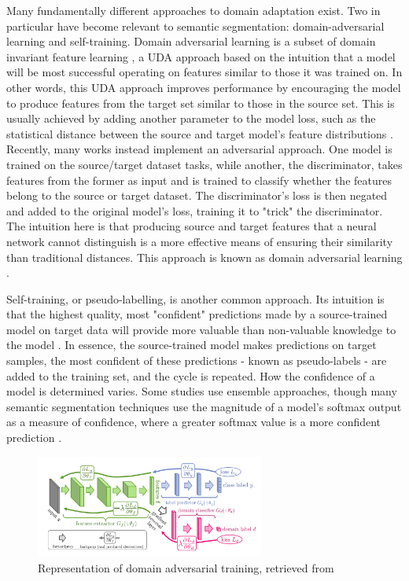 \documentclass[a4paper,12pt]{report}
\begin{document}
Many fundamentally different approaches to domain adaptation exist. Two in particular have become relevant to semantic segmentation: domain-adversarial learning and self-training. Domain adversarial learning is a subset of domain invariant feature learning \cite{wilson_survey_2020}, a UDA approach based on the intuition that a model will be most successful operating on features similar to those it was trained on. In other words, this UDA approach improves performance by encouraging the model to produce features from the target set similar to those in the source set. This is usually achieved by adding another parameter to the model loss, such as the statistical distance between the source and target model's feature distributions \cite{gretton_kernel_2006} \cite{sun_return_2015}. Recently, many works \cite{ganin_unsupervised_2015} \cite{ganin_domain-adversarial_2016} instead implement an adversarial \cite{goodfellow_generative_2014} approach. One model is trained on the source/target dataset tasks, while another, the discriminator, takes features from the former as input and is trained to classify whether the features belong to the source or target dataset. The discriminator's loss is then negated and added to the original model's loss, training it to "trick" the discriminator. The intuition here is that producing source and target features that a neural network cannot distinguish is a more effective means of ensuring their similarity than traditional distances. This approach is known as domain adversarial learning \cite{ganin_domain-adversarial_2016}.

Self-training, or pseudo-labelling, is another common approach. Its intuition is that the highest quality, most "confident" predictions made by a source-trained model on target data will provide more valuable than non-valuable knowledge to the model \cite{wilson_survey_2020} \cite{kamnitsas_transductive_2021}. In essence, the source-trained model makes predictions on target samples, the most confident of these predictions - known as pseudo-labels - are added to the training set, and the cycle is repeated. How the confidence of a model is determined varies. Some studies use ensemble approaches, though many semantic segmentation techniques use the magnitude of a model's softmax output as a measure of confidence, where a greater softmax value is a more confident prediction \cite{zou_domain_2018}.

\begin{figure}[h]
    \centering
    \includegraphics[width=0.67\textwidth]{res/domain-adversarial-training.png}
    \caption{Representation of domain adversarial training, retrieved from
        \cite{ganin_domain-adversarial_2016}}
    \label{fig:domain-adversarial-training}
\end{figure}
\end{document}
